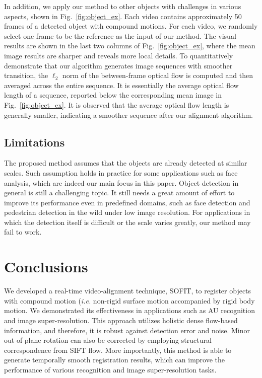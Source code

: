 \documentclass[10pt,journal]{IEEEtran}
\begin{document}
In addition, we apply our method to other objects with challenges in various aspects, shown in Fig.~\ref{fig:object_ex}. Each video contains approximately 50 frames of a detected object with compound motions. For each video, we randomly select one frame to be the reference as the input of our method. The visual results are shown in the last two columns of Fig.~\ref{fig:object_ex}, where the mean image results are sharper and reveals more local details. To quantitatively demonstrate that our algorithm generates image sequences with smoother transition, the $\ell_2$ norm of the between-frame optical flow is computed and then averaged across the entire sequence. It is essentially the average optical flow length of a sequence, reported below the corresponding mean image in Fig.~\ref{fig:object_ex}. It is observed that the average optical flow length is generally smaller, indicating a smoother sequence after our alignment algorithm.

\subsection{Limitations}
The proposed method assumes that the objects are already detected at similar scales. Such assumption holds in practice for some applications such as face analysis, which are indeed our main focus in this paper. Object detection in general is still a challenging topic. It still needs a great amount of effort to improve its performance even in predefined domains, such as face detection and pedestrian detection in the wild under low image resolution. For applications in which the detection itself is difficult or the scale varies greatly, our method may fail to work.


\section{Conclusions\label{sec:conclusion}}

We developed a real-time video-alignment technique, SOFIT, to register objects with compound motion (\textit{i.e.} non-rigid surface motion accompanied by rigid body motion. We demonstrated its effectiveness in applications such as AU recognition and image super-resolution. This approach utilizes holistic dense flow-based information, and therefore, it is robust against detection error and noise. Minor out-of-plane rotation can also be corrected by employing structural correspondence from SIFT flow. More importantly, this method is able to generate temporally smooth registration results, which can improve the performance of various recognition and image super-resolution tasks.
\end{document}
